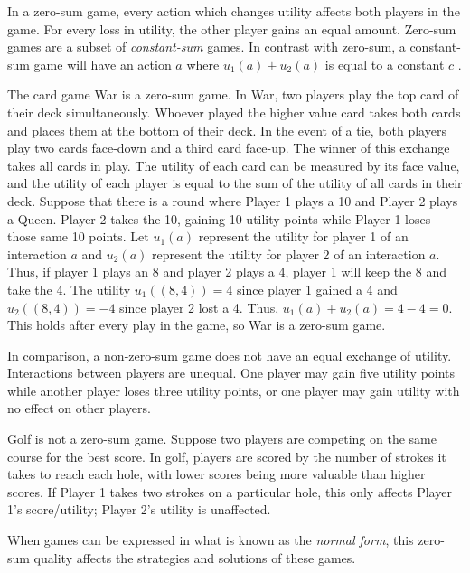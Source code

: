 In a zero-sum game, every action which changes utility affects both players in the game. For every loss in utility, the other player gains an equal amount. Zero-sum games are a subset of \textit{constant-sum} games. In contrast with zero-sum, a constant-sum game will have an action $a$ where $u_1(a)+u_2(a)$ is equal to a constant $c$ \cite{shoh09}.

\begin{exmp}
  The card game War is a zero-sum game. In War, two players play the top card of their deck simultaneously. Whoever played the higher value card takes both cards and places them at the bottom of their deck. In the event of a tie, both players play two cards face-down and a third card face-up. The winner of this exchange takes all cards in play. The utility of each card can be measured by its face value, and the utility of each player is equal to the sum of the utility of all cards in their deck. Suppose that there is a round where Player 1 plays a 10 and Player 2 plays a Queen. Player 2 takes the 10, gaining 10 utility points while Player 1 loses those same 10 points. Let $u_1(a)$ represent the utility for player 1 of an interaction $a$ and $u_2(a)$ represent the utility for player 2 of an interaction $a$. Thus, if player 1 plays an 8 and player 2 plays a 4, player 1 will keep the 8 and take the 4. The utility $u_1((8, 4))=4$ since player 1 gained a 4 and $u_2((8, 4))=-4$ since player 2 lost a 4. Thus, $u_1(a)+u_2(a)=4-4=0$. This holds after every play in the game, so War is a zero-sum game.
\end{exmp}

In comparison, a non-zero-sum game does not have an equal exchange of utility. Interactions between players are unequal. One player may gain five utility points while another player loses three utility points, or one player may gain utility with no effect on other players.

\begin{exmp}
  Golf is not a zero-sum game. Suppose two players are competing on the same course for the best score. In golf, players are scored by the number of strokes it takes to reach each hole, with lower scores being more valuable than higher scores. If Player 1 takes two strokes on a particular hole, this only affects Player 1's score/utility; Player 2's utility is unaffected.
\end{exmp}

When games can be expressed in what is known as the \textit{normal form}, this zero-sum quality affects the strategies and solutions of these games.

